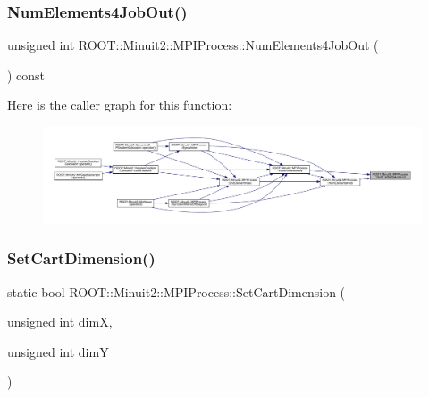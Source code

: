 \mbox{\label{classROOT_1_1Minuit2_1_1MPIProcess_a8ab54fbeb2dd760265e0121573361c3f}} 
\subsubsection{\texorpdfstring{NumElements4JobOut()}{NumElements4JobOut()}\hspace{0.1cm}{\footnotesize\ttfamily [2/2]}}
{\footnotesize\ttfamily unsigned int R\+O\+O\+T\+::\+Minuit2\+::\+M\+P\+I\+Process\+::\+Num\+Elements4\+Job\+Out (\begin{DoxyParamCaption}{ }\end{DoxyParamCaption}) const\hspace{0.3cm}{\ttfamily [inline]}}

Here is the caller graph for this function\+:\nopagebreak
\begin{figure}[H]
\begin{center}
\leavevmode
\includegraphics[width=350pt]{dc/d43/classROOT_1_1Minuit2_1_1MPIProcess_a8ab54fbeb2dd760265e0121573361c3f_icgraph}
\end{center}
\end{figure}
\mbox{\label{classROOT_1_1Minuit2_1_1MPIProcess_a225f9dc66bcc0098c9f9ac0ec7c498b1}} 
\subsubsection{\texorpdfstring{SetCartDimension()}{SetCartDimension()}\hspace{0.1cm}{\footnotesize\ttfamily [1/2]}}
{\footnotesize\ttfamily static bool R\+O\+O\+T\+::\+Minuit2\+::\+M\+P\+I\+Process\+::\+Set\+Cart\+Dimension (\begin{DoxyParamCaption}\item[{unsigned int}]{dimX,  }\item[{unsigned int}]{dimY }\end{DoxyParamCaption})\hspace{0.3cm}{\ttfamily [static]}}

